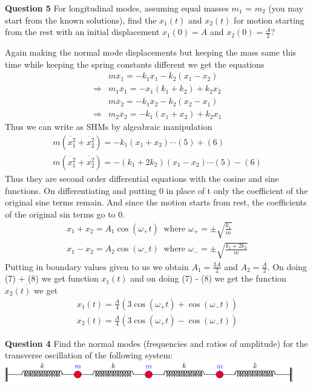 \documentclass[addpoints]{exam}
\begin{document}
\begin{questions}
\textbf{ Question 5}
For longitudinal modes, assuming equal masses $m_1$ = $m_2$ (you may start from the
known solutions), find the $x_1(t)$ and $x_2(t)$ for motion starting from the rest with an
initial displacement $x_1(0) = A$ and $x_2(0) = \frac{A}{2}$?
\begin{solution}
    Again making the normal mode displacements but keeping the mass same this time while keeping the spring constants different we get the equations
    \begin{align}
        &m\ddot{x_1} = -k_1x_1 -k_2(x_1-x_2)\nonumber\\
       \Rightarrow & m_1\ddot{x_1} = -x_1(k_1+k_2) + k_2x_2\\ 
        & m\ddot{x_2} = -k_1x_2 -k_2(x_2-x_1)\nonumber\\ 
       \Rightarrow & m_2\ddot{x_2} = -k_1(x_1+x_2) + k_2x_1
    \end{align}
    Thus we can write as SHMs by algeabraic manipulation
    \begin{align*}
        m(\ddot{x_1^2}+\ddot{x_2^2}) = -k_1(x_1+x_2) \cdots (5)+(6)\\ 
        m(\ddot{x_1^2}+\ddot{x_2^2}) = -(k_1+2k_2)(x_1-x_2) \cdots (5)-(6)
    \end{align*}
    Thus they are second order differential equations with the cosine and sine functions. On differentiating and putting 0 in place of t only the coefficient of the original sine terms 
    remain. And since the motion starts from rest, the coefficients of the original sin terms go to 0.
    \begin{align}
        x_1 + x_2 = A_1 \cos(\omega_+t) ~\text{ where } \omega_+ = \pm\sqrt{\frac{k_1}{m}}\\ 
        x_1 - x_2 = A_2 \cos(\omega_-t) ~\text{ where } \omega_- = \pm\sqrt{\frac{k_1+2k_2}{m}}
    \end{align}
    Putting in boundary values given to us we obtain $A_1=\frac{3A}{2}$ and $A_2 = \frac{A}{2}$. On doing (7) + (8) we get function $x_1(t)$ and on doing (7) - (8) we get the function
    $x_2(t)$ we get 
    \begin{align*}
        x_1(t) = \frac{A}{4}\left(3\cos(\omega_+t) + \cos(\omega_-t)\right)\\ 
        x_2(t) = \frac{A}{4}\left(3\cos(\omega_+t) - \cos(\omega_-t)\right)
    \end{align*}
\end{solution}

\question \textbf{ Question 4}
Find the normal modes (frequencies and ratios of amplitude) for the transverse oscillation of
the following system:\\
\includegraphics[width=5.0in]{q4.png}


\end{questions}
\end{document}
